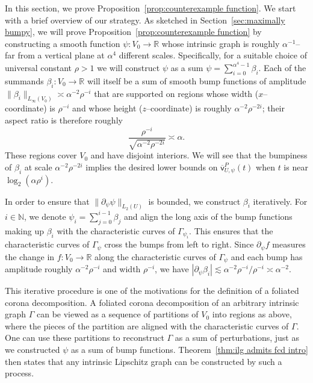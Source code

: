 \documentclass[11pt,reqno]{amsart}
\newcommand{\N}{\mathbb{N}}
\newcommand{\R}{\mathbb{R}}
\renewcommand{\approx}{\asymp}
\newcommand{\0}{\mathbf{0}}
\renewcommand{\1}{\mathbf 1}
\newcommand{\from}{\colon}
\theoremstyle{remark}
\newcommand{\vpP}[1]{{\overline{\mathsf{v}}^{P}_{\!#1}}}
\begin{document}
In this section, we prove Proposition~\ref{prop:counterexample function}.  We start with a brief overview of our strategy. As sketched in Section~\ref{sec:maximally bumpy}, we will prove Proposition~\ref{prop:counterexample function} by constructing a smooth function $\psi\from V_0\to \R$ whose intrinsic graph is roughly $\alpha^{-1}$--far from a vertical plane at $\alpha^4$ different scales.  Specifically, for a suitable choice of universal constant $\rho>1$ we will  construct $\psi$ as a sum $\psi=\sum_{i=0}^{\alpha^4-1}\beta_i$.  Each of the summands $\beta_i\from V_0\to \R$ will itself be a sum of smooth bump functions of amplitude $\|\beta_i\|_{L_\infty(V_0)}\approx \alpha^{-2} \rho^{-i}$ that are supported on regions whose  width ($x$--coordinate) is $\rho^{-i}$ and whose height ($z$--coordinate) is roughly $\alpha^{-2}\rho^{-2i}$; their aspect ratio is therefore roughly $$\frac{\rho^{-i}}{\sqrt{\alpha^{-2}\rho^{-2i}}}\approx \alpha.$$  These regions cover $V_0$ and have disjoint interiors.  We will see that the bumpiness of $\beta_i$ at scale $\alpha^{-2}\rho^{-2i}$ implies the desired lower bounds on $\vpP{U,\psi}(t)$ when $t$ is near $\log_2(\alpha\rho^i)$.

In order to ensure that $\|\partial_\psi \psi\|_{L_2(U)}$ is bounded, we construct $\beta_i$ iteratively.  For $i\in \N$, we denote $\psi_{i}=\sum_{j=0}^{i-1}\beta_j$ and align the long axis of the bump functions making up $\beta_i$ with the characteristic curves  of $\Gamma_{\psi_{i}}$. This ensures that the characteristic curves of $\Gamma_{\psi}$ cross the bumps from left to right.  Since $\partial_{\psi} f$ measures the change in $f\from V_0\to \R$ along the characteristic curves of $\Gamma_\psi$ and each bump has amplitude roughly $\alpha^{-2} \rho^{-i}$ and width $\rho^{-i}$, we have $|\partial_{\psi} \beta_i| \lesssim  \alpha^{-2} \rho^{-i}/\rho^{-i}\asymp \alpha^{-2}$.

This iterative procedure is one of the motivations for the definition of a foliated corona decomposition.  A foliated corona decomposition of an arbitrary intrinsic graph $\Gamma$ can be viewed as a sequence of partitions of $V_0$ into regions as above, where the pieces of the partition are aligned with the characteristic curves of $\Gamma$.  One can use these partitions to reconstruct $\Gamma$ as a sum of perturbations, just as we constructed $\psi$ as a sum of bump functions.  Theorem~\ref{thm:ilg admits fcd intro} then states that any intrinsic Lipschitz graph can be constructed by such a process.
\end{document}

